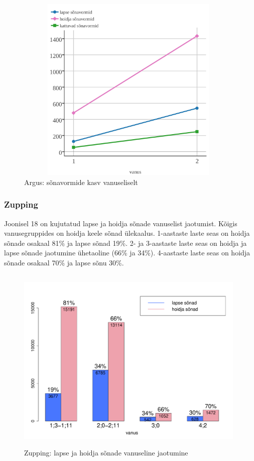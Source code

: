 \documentclass[12pt]{article}
\begin{document}

\begin{figure}[H]
    \centering
    \includegraphics[width=11cm, height=9cm]{argus_kum_crop}
    \caption{Argus: sõnavormide kasv vanuseliselt}
\end{figure}



\subsubsection{Zupping}

Joonisel 18 on kujutatud lapse ja hoidja sõnade vanuselist jaotumist. Kõigis vanusegruppides on hoidja keele sõnad ülekaalus. 1-aastaste laste seas on hoidja sõnade osakaal 81\% ja lapse sõnad 19\%. 2- ja 3-aastaste laste seas on hoidja ja lapse sõnade jaotumine ühetaoline (66\% ja 34\%). 4-aastaste laste seas on hoidja sõnade osakaal 70\% ja lapse sõnu 30\%.

\begin{figure}[H]
    \centering
    \includegraphics[width=11cm, height=9cm]{zupping_vanus_sonad}
    \caption{Zupping: lapse ja hoidja sõnade vanuseline jaotumine}
\end{figure}
\end{document}
